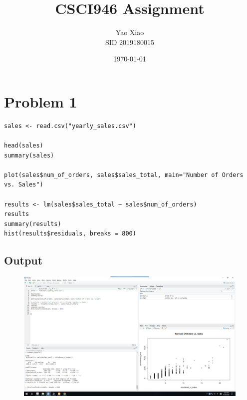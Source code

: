 \documentclass{article}
\title{CSCI946 Assignment}
\author{Yao Xiao \\ SID 2019180015}
\date{\today}
\begin{document}
\maketitle

\section{Problem 1}
\begin{lstlisting}
sales <- read.csv("yearly_sales.csv")

head(sales)
summary(sales)

plot(sales$num_of_orders, sales$sales_total, main="Number of Orders vs. Sales")

results <- lm(sales$sales_total ~ sales$num_of_orders)
results
summary(results)
hist(results$residuals, breaks = 800)
\end{lstlisting}

\subsection{Output}
\begin{figure}[H]
    \includegraphics[width=1\textwidth]{Fig1}
\end{figure}
\end{document}
